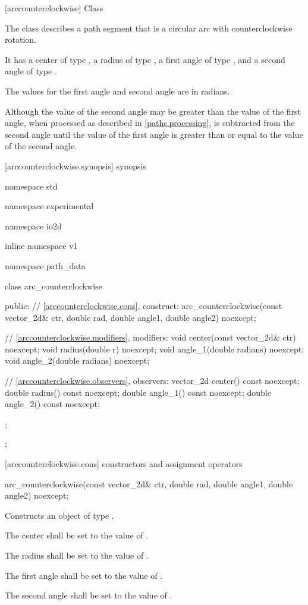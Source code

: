  [arccounterclockwise] {Class }

\pnum
{}
The class  describes a path segment that is a circular arc with counterclockwise rotation.

\pnum
It has a center of type , a radius of type , a first angle of type , and a second angle of type .

\pnum
The values for the first angle and second angle are in radians.

\pnum
\enternote
Although the value of the second angle may be greater than the value of the first angle, when processed as described in \ref{paths.processing},  is subtracted from the second angle until the value of the first angle is greater than or equal to the value of the second angle.
\exitnote

 [arccounterclockwise.synopsis] { synopsis}

\begin{codeblock}
namespace std { namespace experimental { namespace io2d { inline namespace v1 {
  namespace path_data {
    class arc_counterclockwise {
    public:
      // \ref{arccounterclockwise.cons}, construct:
      arc_counterclockwise(const vector_2d& ctr, double rad, double angle1,
        double angle2) noexcept;

      // \ref{arccounterclockwise.modifiers}, modifiers:
      void center(const vector_2d& ctr) noexcept;
      void radius(double r) noexcept;
      void angle_1(double radians) noexcept;
      void angle_2(double radians) noexcept;

      // \ref{arccounterclockwise.observers}, observers:
      vector_2d center() const noexcept;
      double radius() const noexcept;
      double angle_1() const noexcept;
      double angle_2() const noexcept;
    };
  };
} } } }
\end{codeblock}

 [arccounterclockwise.cons] { constructors and assignment operators}

\begin{itemdecl}
    arc_counterclockwise(const vector_2d& ctr, double rad, double angle1,
      double angle2) noexcept;
\end{itemdecl}
\begin{itemdescr}
	\pnum
	\effects
	Constructs an object of type .
	
	\pnum
	The center shall be set to the value of .
	
	\pnum
	The radius shall be set to the value of .
	
	\pnum
	The first angle shall be set to the value of .

	\pnum
	The second angle shall be set to the value of .
\end{itemdescr}


